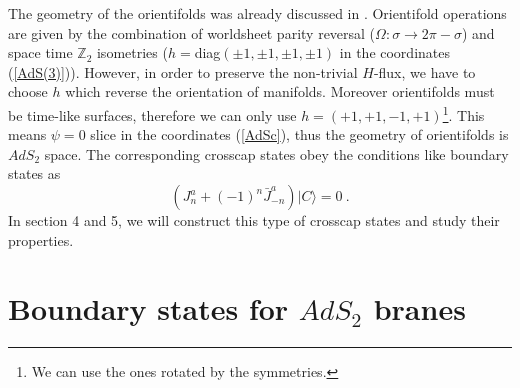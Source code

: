 \documentclass[a4paper,12pt]{article}
\newcommand{\bz}{\mathbb Z}
\newcommand{\ket}[1]{{|#1\rangle}{}}
\begin{document}
The geometry of the orientifolds was already discussed in \cite{oplane3}.
Orientifold operations are given by the combination of worldsheet
parity reversal ($\Omega : \sigma \to 2 \pi - \sigma$) and space
time $\bz_2$ isometries ($h =$diag$(\pm 1, \pm 1, \pm 1, \pm 1)$ in the
coordinates (\ref{AdS(3)})).
However, in order to preserve the non-trivial $H$-flux, we have to choose
$h$ which reverse the orientation of manifolds.
Moreover orientifolds must be time-like surfaces,
therefore we can only use $h = (+1, +1, -1, +1)$\footnote{
We can use the ones rotated by the symmetries. 
}.
This means $\psi = 0$ slice in the coordinates (\ref{AdSc}), 
thus the geometry of orientifolds is $AdS_2$ space. 
The corresponding crosscap states obey the conditions like boundary states as
\begin{equation}
 (J^a_n + (-1)^n \bar{J}^a_{-n}) \ket{C} = 0 ~.
\label{CS}
\end{equation}
In section 4 and 5, we will construct this type of crosscap states and
study their properties. 


\section{Boundary states for $AdS_2$ branes}
\indent
\end{document}
